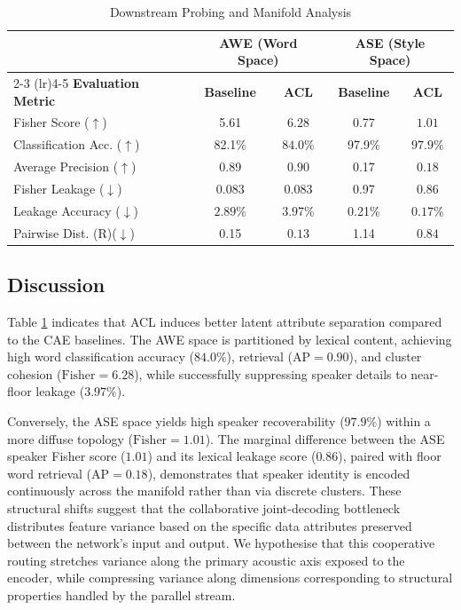 \documentclass[conference,letterpaper]{IEEEtran}
\begin{document}
\begin{table}[H]
\centering
\caption{Downstream Probing and Manifold Analysis}
\label{tab:combined_analysis}
\setlength{\tabcolsep}{2.9pt}
\begin{tabular}{lcccc}
\toprule
 & \multicolumn{2}{c}{\textbf{AWE (Word Space)}} & \multicolumn{2}{c}{\textbf{ASE (Style Space)}} \\
\cmidrule(lr){2-3} \cmidrule(lr){4-5}
\textbf{Evaluation Metric} & \textbf{Baseline} & \textbf{ACL} & \textbf{Baseline} & \textbf{ACL} \\
\midrule
Fisher Score ($\uparrow$)       & 5.61    & $\boldsymbol{6.28}$    & 0.77    & $\boldsymbol{1.01}$    \\
Classification Acc. ($\uparrow$) & 82.1\% & $\boldsymbol{84.0\%}$ & 97.9\% & $\boldsymbol{97.9\%}$ \\
Average Precision ($\uparrow$)    & 0.89   & $\boldsymbol{0.90}$   & 0.17   & $\boldsymbol{0.18}$   \\
\midrule
Fisher Leakage ($\downarrow$)    & 0.083   & 0.083   & 0.97  & $\boldsymbol{0.86}$   \\
Leakage Accuracy ($\downarrow$)  & $\boldsymbol{2.89\%}$ & 3.97\%   & 0.21\%  & $\boldsymbol{0.17\%}$  \\
\midrule
Pairwise Dist. (R)($\downarrow$) & 0.15 & $\boldsymbol{0.13}$ & 1.14 & $\boldsymbol{0.84}$ \\
\bottomrule
\end{tabular}
\end{table}

\subsection{Discussion}

\noindent Table \ref{tab:combined_analysis} indicates that ACL induces better latent attribute separation compared to the CAE baselines. The AWE space is partitioned by lexical content, achieving high word classification accuracy ($84.0\%$), retrieval ($\text{AP}=0.90$), and cluster cohesion ($\text{Fisher}=6.28$), while successfully suppressing speaker details to near-floor leakage ($3.97\%$). 

Conversely, the ASE space yields high speaker recoverability ($97.9\%$) within a more diffuse topology ($\text{Fisher}=1.01$). The marginal difference between the ASE speaker Fisher score ($1.01$) and its lexical leakage score ($0.86$), paired with floor word retrieval ($\text{AP}=0.18$), demonstrates that speaker identity is encoded continuously across the manifold rather than via discrete clusters. These structural shifts suggest that the collaborative joint-decoding bottleneck distributes feature variance based on the specific data attributes preserved between the network's input and output. We hypothesise that this cooperative routing stretches variance along the primary acoustic axis exposed to the encoder, while compressing variance along dimensions corresponding to structural properties handled by the parallel stream.
\end{document}
